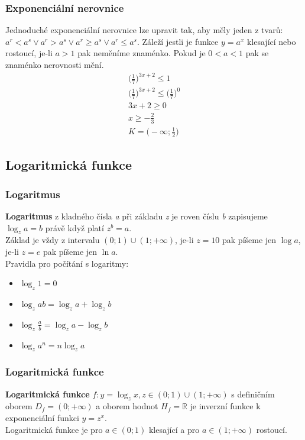 \documentclass[12pt, a4paper]{article}
\begin{document}
\subsubsection*{Exponenciální nerovnice}
Jednoduché exponenciální nerovnice lze upravit tak, aby měly jeden z tvarů:\\ $ a^r < a^s \lor a^r > a^s \lor a^r \geq a^s \lor a^r \leq a^s $. Záleží jestli je funkce $y=a^x$ klesající nebo rostoucí,
je-li $a>1$ pak neměníme znaménko. Pokud je $0<a<1$ pak se znaménko nerovnosti mění.\\
\[
\begin{aligned}
\biggl(\frac{1}{7}\biggr)^{3x+2} \leq 1\\
\biggl(\frac{1}{7}\biggr)^{3x+2} \leq \biggl(\frac{1}{7}\biggr)^0\\
3x+2 \mathbf{\geq} 0\\
x \geq -\frac{2}{3}\\
K=\biggl(-\infty;\frac{1}{2}\biggr)
\end{aligned}
\]
\subsection*{Logaritmická funkce}
\subsubsection*{Logaritmus}
\textbf{Logaritmus} z kladného čísla \textit{a} při základu \textit{z} je roven číslu \textit{b} zapisujeme $\log_z a = b$ právě když platí $z^b=a$.\\
Základ je vždy z intervalu $(0;1) \cup (1;+\infty)$, je-li $z=10$ pak píšeme jen $\log a$, je-li $z=e$ pak píšeme jen $\ln a$.\\

Pravidla pro počítání s logaritmy:
\begin{itemize}
\item $\log_z 1 = 0$
\item $\log_z ab = \log_z a + \log_z b$
\item $\log_z \frac{a}{b} = \log_z a - \log_z b$
\item $\log_z a^n = n \log_z a$
\end{itemize}

\subsubsection*{Logaritmická funkce}
\textbf{Logaritmická funkce} $f: y = \log_z x, z \in (0;1) \cup (1;+\infty)$ s definičním oborem $D_f = (0;+\infty)$ a oborem hodnot $H_f = \mathbb{R}$ je inverzní 
funkce k exponenciální funkci $y=z^x$.\\
Logaritmická funkce je pro $a \in (0;1)$ klesající a pro $a \in (1;+\infty)$ rostoucí.
\end{document}
